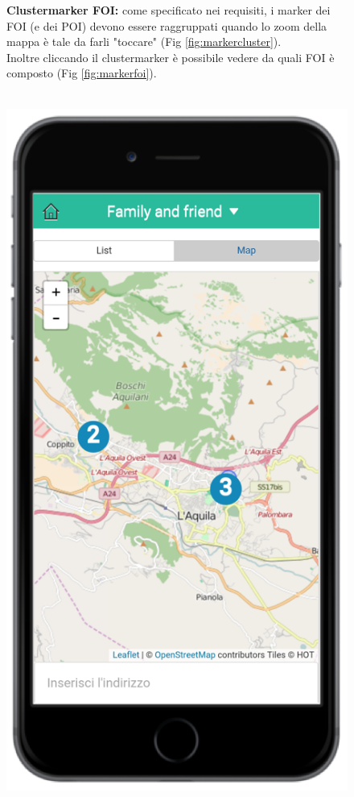  \begin{figure}
 \textbf{Clustermarker FOI:} come specificato nei requisiti, i marker dei FOI (e dei POI) devono essere raggruppati quando lo zoom della mappa è tale da farli "toccare" (Fig \ref{fig:markercluster}).\\
Inoltre cliccando il clustermarker è possibile vedere da quali FOI è composto (Fig \ref{fig:markerfoi}). 
 \\ \\
 \begin{minipage}[b]{6cm}
   \centering
	\includegraphics[scale=0.9]{interfaccia/markercluster.png}

\end{minipage}
\end{figure}
